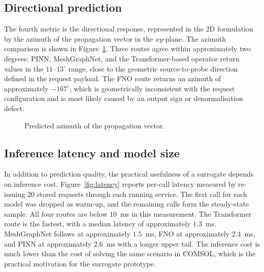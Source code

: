 \subsection{Directional prediction}

The fourth metric is the directional response, represented in the
2D formulation by the azimuth of the propagation vector in the
$xy$-plane. The azimuth comparison is shown in Figure~\ref{fig:azimuth}.
Three routes agree within approximately two degrees: PINN, MeshGraphNet,
and the Transformer-based operator return values in the
$11$--$13^{\circ}$ range, close to the geometric source-to-probe
direction defined in the request payload. The FNO route returns an
azimuth of approximately $-167^{\circ}$, which is geometrically
inconsistent with the request configuration and is most likely caused by
an output sign or denormalisation defect.

\begin{figure}[ht]
\centering
{}
\caption{Predicted azimuth of the propagation vector.}
\label{fig:azimuth}
\end{figure}

\subsection{Inference latency and model size}

In addition to prediction quality, the practical usefulness of a
surrogate depends on inference cost. Figure~\ref{fig:latency} reports
per-call latency measured by re-issuing $20$ stored requests through
each running service. The first call for each model was dropped as
warm-up, and the remaining calls form the steady-state sample. All four
routes are below $10$~ms in this measurement. The Transformer route is
the fastest, with a median latency of approximately $1.3$~ms.
MeshGraphNet follows at approximately $1.5$~ms, FNO at approximately
$2.4$~ms, and PINN at approximately $2.6$~ms with a longer upper tail.
The inference cost is much lower than the cost of solving the same
scenario in COMSOL, which is the practical motivation for the surrogate
prototype.

